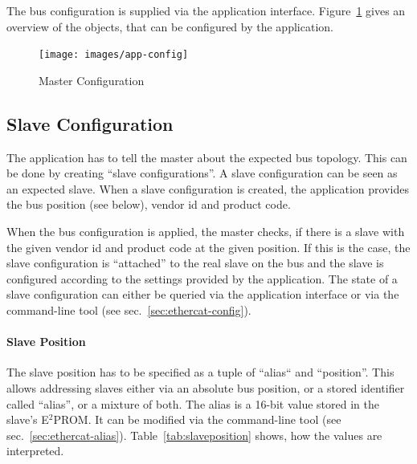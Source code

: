 \documentclass[a4paper,12pt,BCOR6mm,bibtotoc,idxtotoc]{scrbook}
\begin{document}
The bus configuration is supplied via the application interface.
Figure~\ref{fig:app-config} gives an overview of the objects, that can be
configured by the application.

\begin{figure}[htbp]
  \centering
  \texttt{[image: images/app-config]}
  \caption{Master Configuration}
  \label{fig:app-config}
\end{figure}

\subsection{Slave Configuration}

The application has to tell the master about the expected bus topology. This
can be done by creating ``slave configurations''. A slave configuration can be
seen as an expected slave. When a slave configuration is created, the
application provides the bus position (see below), vendor id and product code.

When the bus configuration is applied, the master checks, if there is a slave
with the given vendor id and product code at the given position. If this is
the case, the slave configuration is ``attached'' to the real slave on the bus
and the slave is configured according to the settings provided by the
application. The state of a slave configuration can either be queried via the
application interface or via the command-line tool (see
sec.~\ref{sec:ethercat-config}).

\paragraph{Slave Position} The slave position has to be specified as a tuple
of ``alias`` and ``position''. This allows addressing slaves either via an
absolute bus position, or a stored identifier called ``alias'', or a mixture
of both. The alias is a 16-bit value stored in the slave's E$^2$PROM. It can
be modified via the command-line tool (see sec.~\ref{sec:ethercat-alias}).
Table~\ref{tab:slaveposition} shows, how the values are interpreted.
\end{document}
